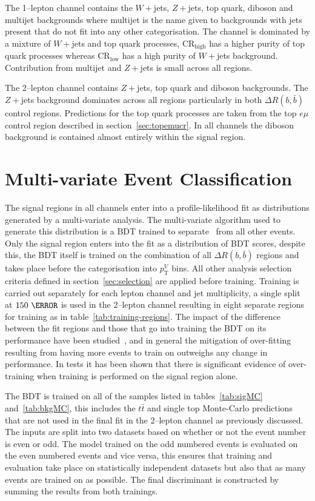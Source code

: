The 1--lepton channel contains the $W+$jets, $Z+$jets, top quark, diboson and
multijet backgrounds where multijet is the name given to backgrounds with jets
present that do not fit into any other categorisation. The channel is dominated
by a mixture of $W+$jets and top quark processes, CR$_{\text{high}}$ has a
higher purity of top quark processes whereas CR$_{\text{low}}$ has a high purity
of $W+$jets background. Contribution from multijet and $Z+$jets is small across
all regions.

The 2--lepton channel contains $Z+$jets, top quark and diboson backgrounds. The
$Z+$jets background dominates across all regions particularly in both $\Delta
R(b, \bar{b})$ control regions. Predictions for the top quark processes are
taken from the top $e \mu$ control region described in
section~\ref{sec:topemucr}. In all channels the diboson background is contained
almost entirely within the signal region.

\section{Multi-variate Event Classification}%
\label{sec:mva}

The signal regions in all channels enter into a profile-likelihood fit as
distributions generated by a multi-variate analysis. The multi-variate algorithm
used to generate this distribution is a BDT trained to separate \VHbb\ from all
other events. Only the signal region enters into the fit as a distribution of
BDT scores, despite this, the BDT itself is trained on the combination of all
$\Delta R(b, \bar{b})$ regions and takes place before the categorisation into
$p_{\mathrm{T}}^V$ bins. All other analysis selection criteria defined in
section~\ref{sec:selection} are applied before training. Training is carried out
separately for each lepton channel and jet multiplicity, a single split at
$150~\GeV$ is used in the 2--lepton channel resulting in eight separate regions
for training as in table~\ref{tab:training-regions}. The impact of the
difference between the fit regions and those that go into training the BDT on
its performance have been studied~\cite{VHMainNote2019}, and in general the
mitigation of over-fitting resulting from having more events to train on
outweighs any change in performance.
 In tests it has been shown that
there is significant evidence of over-training when training is performed on the
signal region alone.

The BDT is trained on all of the samples listed in tables~\ref{tab:sigMC}
and~\ref{tab:bkgMC}, this includes the $t\bar{t}$ and single top Monte-Carlo
predictions that are not used in the final fit in the 2--lepton channel as
previously discussed. The inputs are split into two datasets based on whether or
not the event number is even or odd. The model trained on the odd numbered
events is evaluated on the even numbered events and vice versa, this ensures
that training and evaluation take place on statistically independent datasets
but also that as many events are trained on as possible. The final discriminant
is constructed by summing the results from both trainings.

